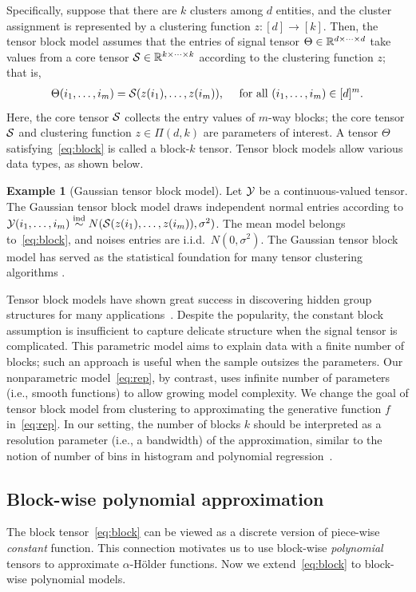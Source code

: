 \documentclass[12pt]{article}
\theoremstyle{definition}
\newtheorem{example}{Example}
\begin{document}
Specifically, suppose that there are $k$ clusters among $d$ entities, and the cluster assignment is represented by a clustering function $z \colon[d]\rightarrow[k]$. Then, the tensor block model assumes that the entries of signal tensor $\Theta\in\mathbb{R}^{d\times \cdots \times d}$ take values from a core tensor $\mathcal{S}\in\mathbb{R}^{k\times\cdots\times k}$ according to the clustering function $z$; that is,
\begin{align}\label{eq:block}
    \Theta(i_1,\ldots,i_m) = \mathcal{S}(z(i_1),\ldots,z(i_m)), \quad \text{ for all } (i_1,\ldots,i_m)\in[d]^m.
\end{align}
Here, the core tensor $\mathcal{S}$ collects the entry values of $m$-way blocks; the core tensor $\mathcal{S}$ and clustering function $z\in \Pi(d,k)$ are parameters of interest. A tensor $\Theta$ satisfying~\eqref{eq:block} is called a block-$k$ tensor. Tensor block models allow various data types, as shown below. 

\begin{example}[Gaussian tensor block model] Let $\mathcal{Y}$ be a continuous-valued tensor. The Gaussian tensor block model draws independent normal entries according to $\mathcal{Y}(i_1,\ldots,i_m)\stackrel{\text{ind}}{\sim} N(\mathcal{S}(z(i_1),\ldots,z(i_m)),\sigma^2)$. The mean model belongs to~\eqref{eq:block}, and noises entries are i.i.d.\ $N(0,\sigma^2)$. The Gaussian tensor block model has served as the statistical foundation for many tensor clustering algorithms \citep{wang2019multiway,han2022exact}.
\end{example}

Tensor block models have shown great success in discovering hidden group structures for many applications~\cite{wang2019multiway,han2022exact}. Despite the popularity, the constant block assumption is insufficient to capture delicate structure when the signal tensor is complicated. 
This parametric model aims to explain data with a finite number of blocks; such an approach is useful when the sample outsizes the parameters. Our nonparametric model~\eqref{eq:rep}, by contrast, uses infinite number of parameters (i.e., smooth functions) to allow growing model complexity. We change the goal of tensor block model from clustering to approximating the generative function $f$ in~\eqref{eq:rep}. In our setting, the number of blocks $k$ should be interpreted as a resolution parameter (i.e., a bandwidth) of the approximation, similar to the notion of number of bins in histogram and polynomial regression~\cite{wasserman2006all}. 

\subsection{Block-wise polynomial approximation}\label{sec:poly}
The block tensor~\eqref{eq:block} can be viewed as a discrete version of piece-wise \emph{constant} function. This connection motivates us to use block-wise \emph{polynomial} tensors to approximate $\alpha$-H\"older functions. Now we extend~\eqref{eq:block} to block-wise polynomial models. 
\end{document}

